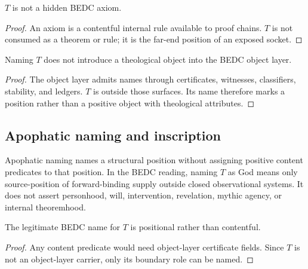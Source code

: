 \begin{corollary}
\label{cor:philosophy-t-not-hidden-axiom}
\(T\) is not a hidden BEDC axiom.
\end{corollary}
\begin{proof}
An axiom is a contentful internal rule available to proof chains.
\(T\) is not consumed as a theorem or rule; it is the far-end position
of an exposed socket.
\end{proof}

\begin{corollary}
\label{cor:philosophy-t-not-object-theology}
Naming \(T\) does not introduce a theological object into the BEDC
object layer.
\end{corollary}
\begin{proof}
The object layer admits names through certificates, witnesses,
classifiers, stability, and ledgers. \(T\) is outside those surfaces.
Its name therefore marks a position rather than a positive object with
theological attributes.
\end{proof}

\subsection{Apophatic naming and inscription}
\label{subsec:philosophy-apophatic-naming-inscription}

\begin{definition}
\label{def:philosophy-apophatic-naming}
Apophatic naming names a structural position without assigning positive
content predicates to that position. In the BEDC reading, naming \(T\)
as God means only source-position of forward-binding supply outside
closed observational systems. It does not assert personhood, will,
intervention, revelation, mythic agency, or internal theoremhood.
\end{definition}

\begin{theorem}
\label{thm:philosophy-t-named-only-by-position}
The legitimate BEDC name for \(T\) is positional rather than
contentful.
\end{theorem}
\begin{proof}
Any content predicate would need object-layer certificate fields. Since
\(T\) is not an object-layer carrier, only its boundary role can be
named.
\end{proof}

